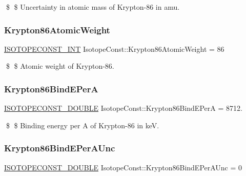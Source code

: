 \$ \$ Uncertainty in atomic mass of Krypton-\/86 in amu. \mbox{\label{group___isotope_const-_krypton-_kr86_ga2bb5429e9259131919270f071cf338f3}} 
\subsubsection{\texorpdfstring{Krypton86\+Atomic\+Weight}{Krypton86AtomicWeight}}
{\footnotesize\ttfamily \mbox{\hyperlink{group___isotope_const-_macros_ga5f18360b3e99483a35c32d789e62621c}{I\+S\+O\+T\+O\+P\+E\+C\+O\+N\+S\+T\+\_\+\+I\+NT}} Isotope\+Const\+::\+Krypton86\+Atomic\+Weight = 86}

\$ \$ Atomic weight of Krypton-\/86. \mbox{\label{group___isotope_const-_krypton-_kr86_gad49287a4eea47039de9bbcaa9f5d8e4c}} 
\subsubsection{\texorpdfstring{Krypton86\+Bind\+E\+PerA}{Krypton86BindEPerA}}
{\footnotesize\ttfamily \mbox{\hyperlink{group___isotope_const-_macros_ga8f45a7272ce02c0b4c65c44636ed719a}{I\+S\+O\+T\+O\+P\+E\+C\+O\+N\+S\+T\+\_\+\+D\+O\+U\+B\+LE}} Isotope\+Const\+::\+Krypton86\+Bind\+E\+PerA = 8712.}

\$ \$ Binding energy per A of Krypton-\/86 in keV. \mbox{\label{group___isotope_const-_krypton-_kr86_ga1e4a7e1f9710f1db77221f603019b8c3}} 
\subsubsection{\texorpdfstring{Krypton86\+Bind\+E\+Per\+A\+Unc}{Krypton86BindEPerAUnc}}
{\footnotesize\ttfamily \mbox{\hyperlink{group___isotope_const-_macros_ga8f45a7272ce02c0b4c65c44636ed719a}{I\+S\+O\+T\+O\+P\+E\+C\+O\+N\+S\+T\+\_\+\+D\+O\+U\+B\+LE}} Isotope\+Const\+::\+Krypton86\+Bind\+E\+Per\+A\+Unc = 0}

